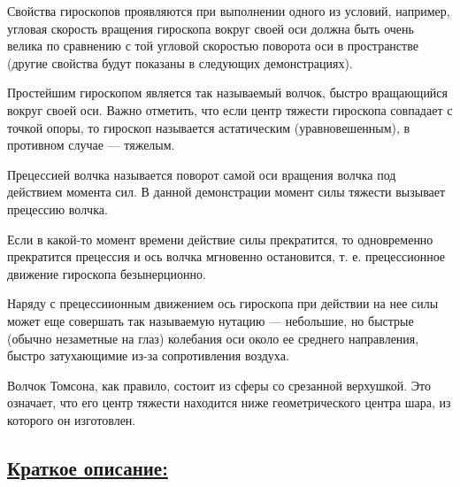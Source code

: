 \documentclass[14pt,a4paper,oneside]{extarticle}	%
\begin{document}
Свойства гироскопов проявляются при выполнении одного из условий, например, угловая скорость вращения гироскопа вокруг своей оси должна быть очень велика по сравнению с той угловой скоростью поворота оси в пространстве (другие свойства будут показаны в следующих демонстрациях).
	
Простейшим гироскопом является так называемый волчок, быстро вращающийся вокруг своей оси.  
Важно отметить, что если центр тяжести гироскопа совпадает с точкой опоры, то гироскоп называется астатическим (уравновешенным), 
в противном случае — тяжелым.

Прецессией волчка называется поворот самой оси вращения волчка под действием момента сил. В данной демонстрации момент силы тяжести вызывает прецессию волчка.

Если в какой-то момент времени действие силы прекратится, то одновременно прекратится прецессия и ось 
волчка мгновенно остановится, т. е. прецессионное движение гироскопа безынерционно.

Наряду с прецессиионным движением ось гироскопа при действии на нее силы может еще совершать так называемую нутацию — небольшие, 
но быстрые (обычно незаметные на глаз) колебания оси около ее среднего направления, быстро затухающимие из-за сопротивления воздуха.

Волчок Томсона, как правило, состоит из сферы со срезанной верхушкой. 
Это означает, что его центр тяжести находится ниже геометрического центра шара, из которого он изготовлен. 

	\subsection*{\underline{Краткое описание:}}
	
\end{document}
